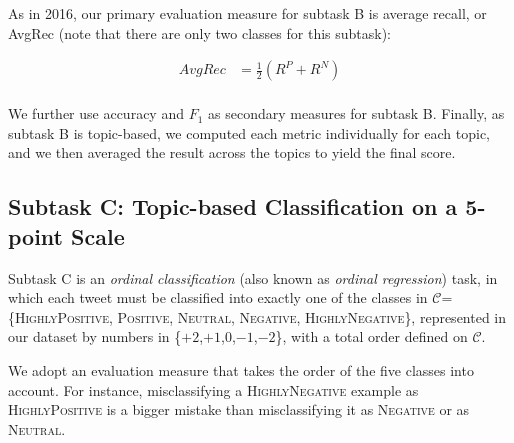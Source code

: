 \documentclass[11pt,a4paper]{article}
\begin{document}
As in 2016, our primary evaluation measure for subtask B is average recall, or AvgRec
(note that there are only two classes for this subtask): 

\begin{equation}
  \begin{aligned}
    \label{eq:rhoPN}
    AvgRec & = \frac{1}{2}(R^{P}+R^{N}) \\
  \end{aligned}
\end{equation}

We further use accuracy and $F_1$ as secondary measures for subtask B.
Finally, as subtask B is topic-based, we computed each metric individually for each topic, and we then averaged the result across the topics to yield the final score.


\subsection{Subtask C: Topic-based Classification on a 5-point Scale} 

\noindent Subtask C is an \emph{ordinal classification} (also
known as \emph{ordinal regression}) task, in which each tweet must be
classified into exactly one of the classes in
$\mathcal{C}$=\{\textsc{HighlyPositive}, \textsc{Positive},
\textsc{Neutral}, \textsc{Negative}, \textsc{HighlyNegative}\},
represented in our dataset by numbers in \{$+2$,$+1$,$0$,$-1$,$-2$\}, with a
total order defined on $\mathcal{C}$.

We adopt an evaluation measure that takes the order of the five classes into account. For instance, misclassifying a \textsc{HighlyNegative} example as \textsc{HighlyPositive} is a bigger mistake than misclassifying it as \textsc{Negative} or as \textsc{Neutral}.


%

\end{document}
